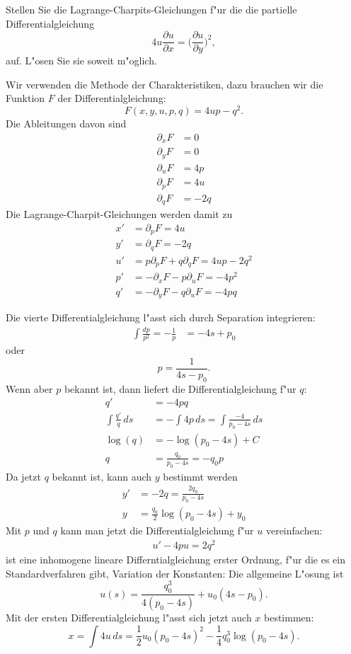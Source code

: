Stellen Sie die Lagrange-Charpits-Gleichungen f"ur die
die partielle Differentialgleichung
\[
4u\frac{\partial u}{\partial x}=\biggl(\frac{\partial u}{\partial y}\biggr)^2,
\]
auf. L"osen Sie sie soweit m"oglich.

\begin{loesung}
Wir verwenden die Methode der Charakteristiken, dazu brauchen wir die
Funktion $F$ der Differentialgleichung:
\[
F(x,y,u,p,q)=4up-q^2.
\]
Die Ableitungen davon sind
\begin{align*}
\partial_x F&=0\\
\partial_y F&=0\\
\partial_u F&=4p\\
\partial_p F&=4u\\
\partial_q F&=-2q
\end{align*}
Die Lagrange-Charpit-Gleichungen werden damit zu
\begin{align*}
x'&=\partial_pF=4u\\
y'&=\partial_qF=-2q\\
u'&=p\partial_pF+q\partial_qF=4up-2q^2\\
p'&=-\partial_xF-p\partial_uF=-4p^2\\
q'&=-\partial_yF-q\partial_uF=-4pq
\end{align*}

Die vierte Differentialgleichung l"asst sich durch Separation integrieren:
\begin{align*}
\int \frac{dp}{p^2}=-\frac1{p}&=-4s+p_0
\end{align*}
oder 
\[
p=\frac1{4s-p_0}.
\]
Wenn aber $p$ bekannt ist, dann liefert die Differentialgleichung
f"ur $q$:
\begin{align*}
q'&=-4pq
\\
\int \frac{q'}{q}\,ds&=-\int 4p\,ds=\int\frac{-4}{p_0-4s}\,ds
\\
\log(q)&=-\log(p_0-4s) + C\\
q&=\frac{q_0}{p_0-4s}=-q_0p
\end{align*}
Da jetzt $q$ bekannt ist, kann auch $y$ bestimmt werden
\begin{align*}
y'&=-2q=\frac{2q_0}{p_0-4s}\\
y&= \frac{q_0}2\log(p_0-4s)+y_0
\end{align*}
Mit $p$ und $q$ kann man jetzt die Differentialgleichung f"ur
$u$ vereinfachen:
\begin{align*}
u'-4pu=2q^2
\end{align*}
ist eine inhomogene lineare Differntialgleichung erster Ordnung,
f"ur die es ein Standardverfahren gibt, Variation der Konstanten:
Die allgemeine L"osung ist
\[
u(s)=\frac{q_0^3}{4(p_0-4s)} + u_0(4s-p_0).
\]
Mit der ersten Differentialgleichung l"asst sich jetzt auch $x$
bestimmen:
\[
x=\int 4u\,ds=
\frac{1}{2} u_0 (p_0-4 s)^2-\frac{1}{4} q_0^3 \log(p_0-4 s).
\]
\end{loesung}
